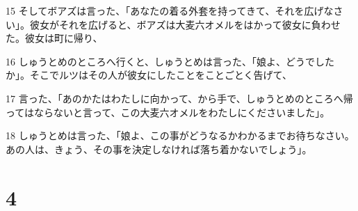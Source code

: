 \par 15 そしてボアズは言った、「あなたの着る外套を持ってきて、それを広げなさい」。彼女がそれを広げると、ボアズは大麦六オメルをはかって彼女に負わせた。彼女は町に帰り、
\par 16 しゅうとめのところへ行くと、しゅうとめは言った、「娘よ、どうでしたか」。そこでルツはその人が彼女にしたことをことごとく告げて、
\par 17 言った、「あのかたはわたしに向かって、から手で、しゅうとめのところへ帰ってはならないと言って、この大麦六オメルをわたしにくださいました」。
\par 18 しゅうとめは言った、「娘よ、この事がどうなるかわかるまでお待ちなさい。あの人は、きょう、その事を決定しなければ落ち着かないでしょう」。

\chapter{4}

